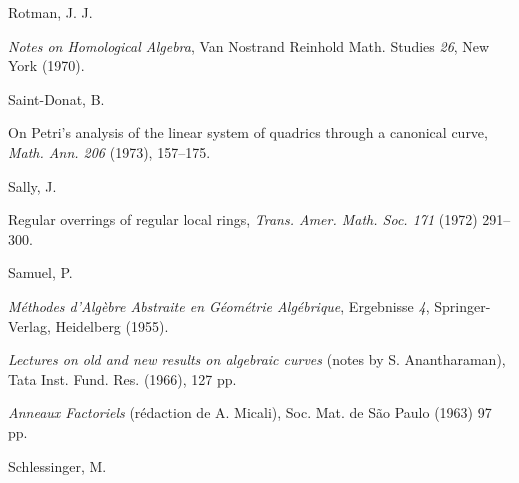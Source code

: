 {\par\vspace{2.15pt}\noindent Rotman, J. J.\par
\noindent\hangindent=25bp\hspace*{6bp}%
\emph{Notes on Homological Algebra}, Van Nostrand Reinhold Math. Studies \emph{26}, New York (1970).\par
\par\vspace{2.15pt}\noindent Saint-Donat, B.\par
\noindent\hangindent=25bp\hspace*{6bp}%
On Petri's analysis of the linear system of quadrics through a canonical curve, \emph{Math. Ann. 206} (1973), 157--175.\par
\par\vspace{2.15pt}\noindent Sally, J.\par
\noindent\hangindent=25bp\hspace*{6bp}%
Regular overrings of regular local rings, \emph{Trans. Amer. Math. Soc. 171} (1972) 291--300.\par
\par\vspace{2.15pt}\noindent Samuel, P.\par
\noindent\hangindent=25bp\hspace*{6bp}%
\emph{M\'ethodes d'Alg\`ebre Abstraite en G\'eom\'etrie Alg\'ebrique}, Ergebnisse \emph{4}, Springer-Verlag, Heidelberg (1955).\par
\noindent\hangindent=25bp\hspace*{6bp}%
\emph{Lectures on old and new results on algebraic curves} (notes by S. Anantharaman), Tata Inst. Fund. Res. (1966), 127 pp.\par
\noindent\hangindent=25bp\hspace*{6bp}%
\emph{Anneaux Factoriels} (r\'edaction de A. Micali), Soc. Mat. de S\~ao Paulo (1963) 97 pp.\par
\par\vspace{2.15pt}\noindent Schlessinger, M.\par
}
